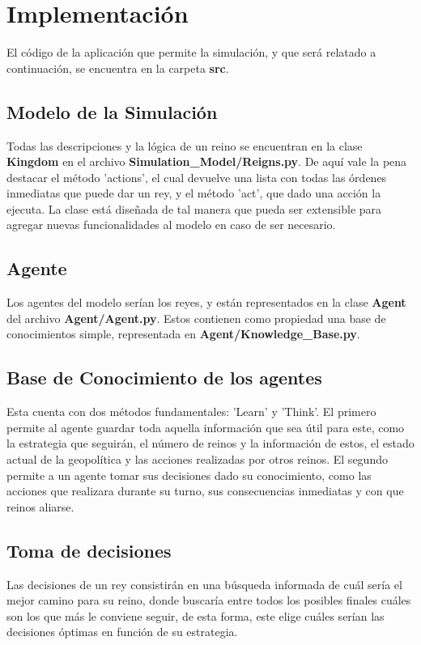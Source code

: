 \documentclass[11pt]{article}
\begin{document}
    \newpage

    \section{Implementación}
    El código de la aplicación que permite la simulación, y que será relatado a continuación, se encuentra 
    en la carpeta \textbf{src}.

        \subsection{Modelo de la Simulación}
        Todas las descripciones y la lógica de un reino se encuentran en la clase \textbf{Kingdom} en el archivo 
        \textbf{Simulation\_Model/Reigns.py}. De aquí vale la pena destacar el método 'actions', el cual devuelve una 
        lista con todas las órdenes inmediatas que puede dar un rey, y el método 'act', que dado una acción 
        la ejecuta. La clase está diseñada de tal manera que pueda ser extensible para agregar nuevas 
        funcionalidades al modelo en caso de ser necesario.

        \subsection{Agente}
        Los agentes del modelo serían los reyes, y están representados en la clase \textbf{Agent} del archivo 
        \textbf{Agent/Agent.py}. Estos contienen como propiedad una base de conocimientos simple, representada 
        en \textbf{Agent/Knowledge\_Base.py}.

        \subsection{Base de Conocimiento de los agentes}
        Esta cuenta con dos métodos fundamentales: 'Learn' y 'Think'. El primero permite al agente guardar 
        toda aquella información que sea útil para este, como la estrategia que seguirán, el número de 
        reinos y la información de estos, el estado actual de la geopolítica y las acciones realizadas 
        por otros reinos. El segundo permite a un agente tomar sus decisiones dado su conocimiento, como 
        las acciones que realizara durante su turno, sus consecuencias inmediatas y con que reinos aliarse.

        \subsection{Toma de decisiones}
        Las decisiones de un rey consistirán en una búsqueda informada de cuál sería el mejor camino para 
        su reino, donde buscaría entre todos los posibles finales cuáles son los que más le conviene seguir, 
        de esta forma, este elige cuáles serían las decisiones óptimas en función de su estrategia.
\end{document}
